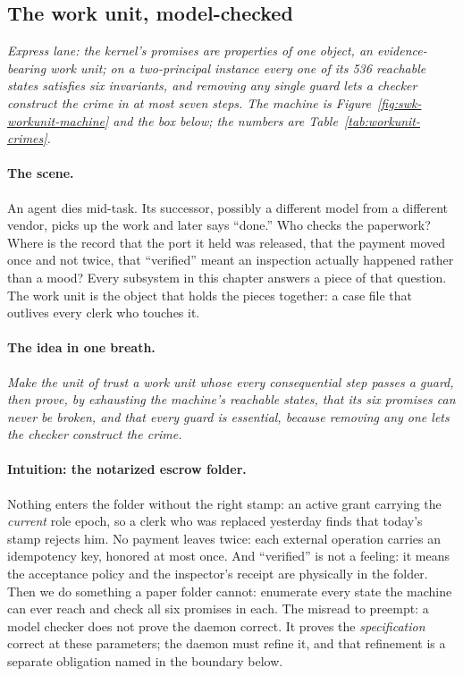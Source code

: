 \documentclass[11pt,a4paper]{article}
\theoremstyle{definition}
\theoremstyle{remark}
\begin{document}
\subsection{The work unit, model-checked}
\label{sec:workunit}

\noindent\emph{Express lane: the kernel's promises are properties of one object, an
evidence-bearing work unit; on a two-principal instance every one of its 536 reachable
states satisfies six invariants, and removing any single guard lets a checker construct the
crime in at most seven steps. The machine is Figure~\ref{fig:swk-workunit-machine} and the box below; the numbers are
Table~\ref{tab:workunit-crimes}.}

\paragraph{The scene.}
An agent dies mid-task. Its successor, possibly a different model from a different vendor,
picks up the work and later says ``done.'' Who checks the paperwork? Where is the record
that the port it held was released, that the payment moved once and not twice, that
``verified'' meant an inspection actually happened rather than a mood? Every subsystem in this
chapter answers a piece of that question. The work unit is the object that holds the
pieces together: a case file that outlives every clerk who touches it.

\paragraph{The idea in one breath.}
\emph{Make the unit of trust a work unit whose every consequential step passes a guard,
then prove, by exhausting the machine's reachable states, that its six promises can never
be broken, and that every guard is essential, because removing any one lets the checker
construct the crime.}

\paragraph{Intuition: the notarized escrow folder.}
Nothing enters the folder without the right stamp: an active grant carrying the
\emph{current} role epoch, so a clerk who was replaced yesterday finds that today's stamp
rejects him. No payment leaves twice: each external operation carries an idempotency key,
honored at most once. And ``verified'' is not a feeling: it means the acceptance policy and
the inspector's receipt are physically in the folder. Then we do something a paper folder
cannot: enumerate every state the machine can ever reach and check all six promises in each.
The misread to preempt: a model checker does not prove the daemon correct. It proves the
\emph{specification} correct at these parameters; the daemon must refine it, and that
refinement is a separate obligation named in the boundary below.
\end{document}
